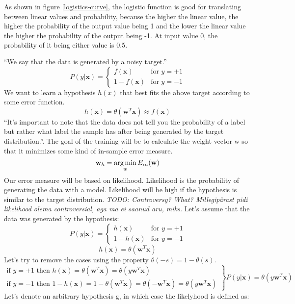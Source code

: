 As shown in figure \ref{logistics-curve}, the logistic function is good for
translating between linear values and probability, because the higher the linear value, the higher the probability of the output value being 1 and the lower the linear value the higher the probability of the output being -1. At input value 0, the probability of it being either value is 0.5.

``We say that the data is generated by a noisy
target.''\cite{website:logistic-regression} 
\[ P(y|\mathbf{x}) = \left\{
\begin{array}{ll}
f(\mathbf{x}) & \mbox{for } y = +1 \\
1 - f(\mathbf{x}) & \mbox{for } y = -1
\end{array} \right. \]
We want to learn a hypothesis $h(x)$ that best fits the above target according to some error function.
\[h(\mathbf{x}) = \theta \left( \mathbf{w}^T \mathbf{x} \right)\approx f(\mathbf{x})\]
``It's important to note that the data does not tell you the probability of a
label but rather what label the sample has after being generated by the target
distribution.''\cite{website:logistic-regression}. The goal of the training will be to calculate the weight vector w so that it minimizes some kind of in-sample error measure.
\[\mathbf{w}_h = \operatorname*{arg\,min}_w E_{in} (\mathbf{w})\]
Our error measure will be based on likelihood. Likelihood is the probability of generating the data with a model. Likelihood will be high if the hypothesis is similar to the target distribution. \emph{TODO: Controversy? What? Millegipärast pidi likelihood olema controversial, aga ma ei saanud aru, miks.} Let's assume that the data was generated by the hypothesis:
\[P(y|\mathbf{x}) = \left\{ 
\begin{array}{ll}
h(\mathbf{x}) & \mbox{for } y = + 1 \\
1 - h(\mathbf{x}) & \mbox{for } y = -1
\end{array}
\right.\]
\[h(\mathbf{x}) = \theta (\mathbf{w}^T \mathbf{x})\]
Let's try to remove the cases using the property $\theta(-s) = 1 - \theta (s)$.
\[\left.
\begin{array}{l}
\mbox{if $y=+1$ then } h(\mathbf{x}) = \theta (\mathbf{w}^T \mathbf{x}) = \theta (y \mathbf{w}^T \mathbf{x}) \\
\mbox{if $y=-1$ then } 1 - h(\mathbf{x}) = 1 - \theta (\mathbf{w}^T \mathbf{x}) = \theta (-\mathbf{w}^T \mathbf{x}) = \theta (y \mathbf{w}^T \mathbf{x})
\end{array}
\right\} P(y | \mathbf{x}) = \theta(y \mathbf{w}^T \mathbf{x})\]
Let's denote an arbitrary hypothesis g, in which case the likelyhood is defined as:
